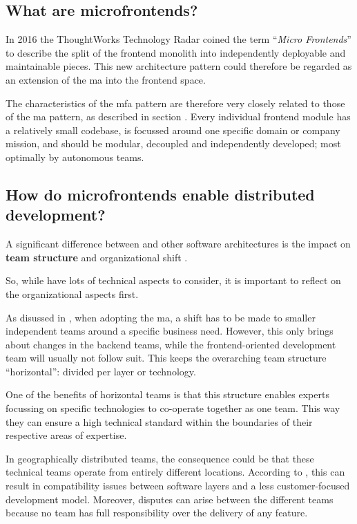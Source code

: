 \subsection{What are microfrontends?}

In 2016 the ThoughtWorks Technology Radar \autocite{ThoughtWorks_2020} coined
the term ``\textit{Micro Frontends}'' to describe the split of the
\gls{frontend} \gls{monolith} into independently deployable and maintainable
pieces. This new architecture pattern could therefore be regarded as an
extension of the \gls{ma} into the \gls{frontend} space.

The characteristics of the \gls{mfa} pattern are therefore very closely related
to those of the \gls{ma} pattern, as described in section
. Every individual \gls{frontend} module has a
relatively small codebase, is focussed around one specific domain or company
mission, and should be modular, decoupled and independently developed; most
optimally by autonomous teams.

\subsection{How do microfrontends enable distributed development?}

A significant difference between  and other software
architectures is the impact on \textbf{team structure} and organizational shift
\autocite{Geers_2020}.

So, while  have lots of technical aspects to consider,
it is important to reflect on the organizational aspects first.

As disussed in , when adopting the \gls{ma}, a shift
has to be made to smaller independent teams around a specific business need.
However, this only brings about changes in the \gls{backend} teams, while the
\gls{frontend}-oriented development team will usually not follow suit. This
keeps the overarching team structure ``horizontal'': divided per layer or
technology.

One of the benefits of horizontal teams is that this structure enables experts
focussing on specific technologies to co-operate together as one team. This way
they can ensure a high technical standard within the boundaries of their
respective areas of expertise.

In geographically distributed teams, the consequence could be that these
technical teams operate from entirely different locations. According to
\textcite{Smite_etal_2010}, this can result in compatibility issues between software
layers and a less customer-focused development model. Moreover, disputes can
arise between the different teams because no team has full responsibility over
the delivery of any feature.


